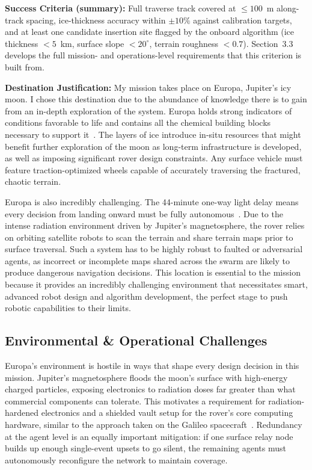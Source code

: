 \documentclass[11pt]{article}
\begin{document}
\textbf{Success Criteria (summary):} Full traverse track covered at $\leq 100$~m
along-track spacing, ice-thickness accuracy within $\pm 10\%$ against calibration targets, and
at least one candidate insertion site flagged by the onboard algorithm (ice thickness $<5$~km,
surface slope $<20^\circ$, terrain roughness $<0.7$). Section~3.3 develops the full mission- and
operations-level requirements that this criterion is built from.

\textbf{Destination Justification:} My mission takes place on Europa, Jupiter's icy
moon. I chose this destination due to the abundance of knowledge there is to gain from an
in-depth exploration of the system. Europa holds strong indicators of conditions favorable to
life and contains all the chemical building blocks necessary to support it~\cite{owlDecadal}.
The layers of ice introduce in-situ resources that might benefit further exploration of the moon
as long-term infrastructure is developed, as well as imposing significant rover design
constraints. Any surface vehicle must feature traction-optimized wheels capable of accurately
traversing the fractured, chaotic terrain.

Europa is also incredibly challenging. The 44-minute one-way light delay means every decision
from landing onward must be fully autonomous~\cite{nasaSBIR}. Due to the intense radiation
environment driven by Jupiter's magnetosphere, the rover relies on orbiting satellite robots to
scan the terrain and share terrain maps prior to surface traversal. Such a system has to be
highly robust to faulted or adversarial agents, as incorrect or incomplete maps shared across
the swarm are likely to produce dangerous navigation decisions. This location is essential to the
mission because it provides an incredibly challenging environment that necessitates smart,
advanced robot design and algorithm development, the perfect stage to push robotic
capabilities to their limits.

\subsection{Environmental \& Operational Challenges}

Europa's environment is hostile in ways that shape every design decision in this mission.
Jupiter's magnetosphere floods the moon's surface with high-energy charged particles, exposing
electronics to radiation doses far greater than what commercial components can tolerate. This
motivates a requirement for radiation-hardened electronics and a shielded vault setup for the
rover's core computing hardware, similar to the approach taken on the Galileo
spacecraft~\cite{owlDecadal}. Redundancy at the agent level is an equally important mitigation:
if one surface relay node builds up enough single-event upsets to go silent, the remaining agents
must autonomously reconfigure the network to maintain coverage.
\end{document}
